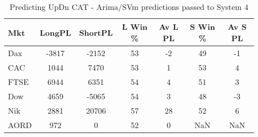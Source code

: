 \begin{table}[ht]
\centering
\caption[Predicting UpDn CAT - Arima/SVM predictions passed to System 4.]{Predicting UpDn CAT - Arima/SVm predictions passed to System 4} 
\label{tab:chp_ts:pUD_CAT_arima_svm_sys}
\begin{tabular}{lcccccc}
  \toprule Mkt & LongPL & ShortPL & L Win \% & Av L PL & S Win \% & Av S PL \\ 
  \midrule Dax & -3817 & -2152 & 53 & -2 & 49 & -1 \\ 
  CAC & 1044 & 7470 & 53 & 1 & 53 & 4 \\ 
  FTSE & 6944 & 6351 & 54 & 4 & 51 & 3 \\ 
  Dow & 4659 & -5065 & 54 & 3 & 48 & -3 \\ 
  Nik & 2881 & 20706 & 57 & 28 & 52 & 6 \\ 
  AORD & 972 & 0 & 52 & 0 & NaN & NaN \\ 
   \bottomrule \end{tabular}
\end{table}
